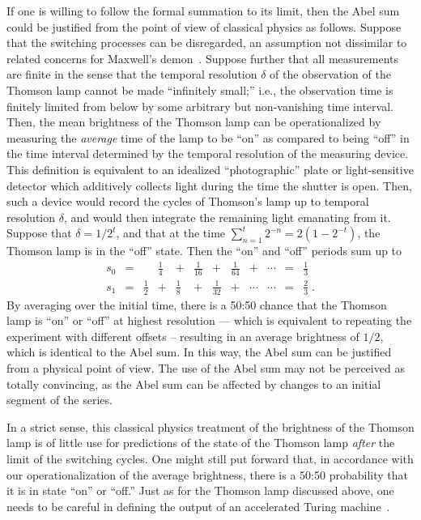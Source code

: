 \documentclass{llncs}
\begin{document}
If one is willing to follow the formal summation to its limit,
then the Abel sum could be justified from the point of view of classical physics as follows.
Suppose that the switching processes can be disregarded,
an assumption not dissimilar to related concerns for Maxwell's demon~\cite{maxwell-demon}.
Suppose further that all measurements are finite in the sense that the temporal resolution $\delta$ of the observation of the Thomson lamp cannot be made ``infinitely small;''
i.e., the observation time is finitely limited from below by some arbitrary but non-vanishing time interval.
Then, the mean  brightness of the Thomson lamp can be operationalized by measuring the {\em average} time of the lamp to be ``on'' as compared to
being ``off'' in the time interval determined by the  temporal resolution of the measuring device.
This definition is equivalent to an idealized ``photographic'' plate or light-sensitive detector which additively collects light during the time the shutter is open.
Then, such a device would record the cycles of Thomson's lamp up to temporal resolution $\delta$, and would then integrate the remaining light emanating from it.
Suppose that $\delta = 1/2^t$, and that at the time $\sum_{n=1}^t 2^{-n}=2\left(1-2^{-t}\right)$, the Thomson lamp is in the ``off'' state.
Then the ``on'' and ``off'' periods sum up to
\begin{equation}
\begin{array}{lclllllllllllllllllll}
s_0&=&  &    \frac{1}{4}   &+&    \frac{1}{16} &+&    \frac{1}{64}  &+& \cdots  &=&   \frac{1}{3}   \\
s_1&=&\frac{1}{2}   &+&    \frac{1}{8} &+&    \frac{1}{32}     &+& \cdots &\cdots  &=&   \frac{2}{3} \; .
\end{array}
\end{equation}
By averaging over the initial time, there is a 50:50 chance that the Thomson lamp is ``on'' or ``off'' at highest resolution --- which is equivalent to
repeating the experiment with different offsets -- resulting in an average brightness of $1/2$, which is identical to the Abel sum.
In this way, the Abel sum can be justified from a physical point of view.
The use of the Abel sum may not be perceived as totally convincing, as the Abel sum can be affected by changes to an initial segment
of the series.


In a strict sense, this classical physics treatment of the brightness of the Thomson lamp is of little use for predictions of the state of the Thomson lamp {\em after} the limit of the switching cycles.
One might still put forward that, in accordance with our operationalization of the average brightness, there is a 50:50 probability that it is in state ``on'' or ``off.''
Just as for the Thomson lamp discussed above, one needs to be careful in defining the output of
an accelerated Turing
machine~\cite{svozil-93,maryland,quantum-omega,svo-1995-paradox,sv-aut-rev,Copeland98eventuring,potgieter-06,1011191}.
\end{document}

